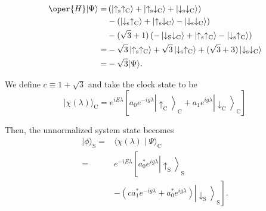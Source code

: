 $$
\begin{aligned}
\oper{H}|\Psi\rangle= & \left(\left|\uparrow_{\mathrm{s}} \uparrow_{\mathrm{C}}\right\rangle+\left|\uparrow_{\mathrm{s}} \downarrow_{\mathrm{C}}\right\rangle+\left|\downarrow_{\mathrm{s}} \downarrow_{\mathrm{C}}\right\rangle\right) \\
& -\left(\left|\downarrow_{\mathrm{s}} \uparrow_{\mathrm{C}}\right\rangle+\left|\uparrow_{\mathrm{s}} \downarrow_{\mathrm{C}}\right\rangle-\left|\downarrow_{\mathrm{s}} \downarrow_{\mathrm{C}}\right\rangle\right) \\
& -(\sqrt{3}+1)\left(-\left|\downarrow_{\mathrm{S}} \downarrow_{\mathrm{C}}\right\rangle+\left|\uparrow_{\mathrm{s}} \uparrow_{\mathrm{C}}\right\rangle-\left|\downarrow_{\mathrm{s}} \uparrow_{\mathrm{C}}\right\rangle\right) \\
= & -\sqrt{3}\left|\uparrow_{\mathrm{s}} \uparrow_{\mathrm{C}}\right\rangle+\sqrt{3}\left|\downarrow_{\mathrm{s}} \uparrow_{\mathrm{C}}\right\rangle+(\sqrt{3}+3)\left|\downarrow_{\mathrm{s}} \downarrow_{\mathrm{C}}\right\rangle \\
= & -\sqrt{3}|\Psi\rangle .
\end{aligned}
$$

We define $c \equiv 1+\sqrt{3}$ and take the clock state to be
$$
|\chi(\lambda)\rangle_{\mathrm{C}}=e^{i E \lambda}\left[a_0 e^{-i g \lambda}\left|\uparrow_{\mathrm{C}}\right\rangle_{\mathrm{C}}+a_1 e^{i g \lambda}\left|\downarrow_{\mathrm{C}}\right\rangle_{\mathrm{C}}\right]
$$

Then, the unnormalized system state becomes
$$
\begin{aligned}
|\phi\rangle_{\mathrm{S}}= & \langle\chi(\lambda) \mid \Psi\rangle_{\mathrm{C}} \\
= & e^{-i E \lambda}\left[a_0^* e^{i g \lambda}\left|\uparrow_{\mathrm{S}}\right\rangle_{\mathrm{S}}\right. \\
& \left.-\left(c a_1^* e^{-i g \lambda}+a_0^* e^{i g \lambda}\right)\left|\downarrow_{\mathrm{S}}\right\rangle_{\mathrm{S}}\right] .
\end{aligned}
$$

